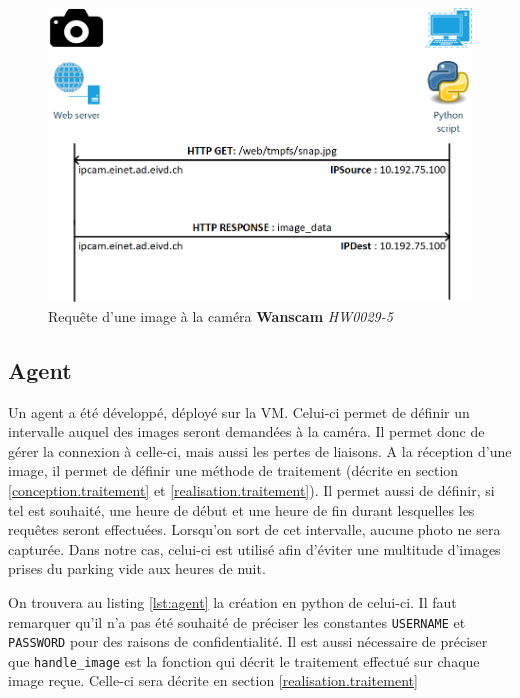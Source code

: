 \begin{figure}[H]
    \includegraphics[width=130mm]{img/realisation/cam_request.png}
    \centering
    \caption{Requête d'une image à la caméra \textbf{Wanscam} \textit{HW0029-5}}
    \label{fig:image_request}
\end{figure} 

\subsection{Agent}\label{realisation.capture.agent}
Un agent a été développé, déployé sur la VM. Celui-ci permet de définir un intervalle auquel des images seront demandées à la caméra. Il permet donc de gérer la connexion à celle-ci, mais aussi les pertes de liaisons. A la réception d'une image, il permet de définir une méthode de traitement (décrite en section \ref{conception.traitement} et \ref{realisation.traitement}). 
Il permet aussi de définir, si tel est souhaité, une heure de début et une heure de fin durant lesquelles les requêtes seront effectuées. Lorsqu'on sort de cet intervalle, aucune photo ne sera capturée. Dans notre cas, celui-ci est utilisé afin d'éviter une multitude d'images prises du parking vide aux heures de nuit.

On trouvera au listing \ref{lst:agent} la création en python de celui-ci. Il faut remarquer qu'il n'a pas été souhaité de préciser les constantes \lstinline[columns=fixed]{USERNAME} et \lstinline[columns=fixed]{PASSWORD} pour des raisons de confidentialité. Il est aussi nécessaire de préciser que \lstinline[columns=fixed]{handle_image} est la fonction qui décrit le traitement effectué sur chaque image reçue. Celle-ci sera décrite en section \ref{realisation.traitement}


